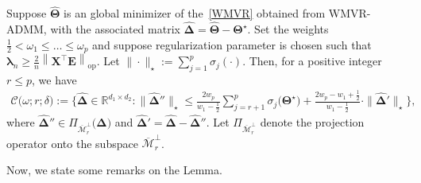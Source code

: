 \documentclass[alpha-refs]{wiley-article}
\begin{document}
\begin{lemma} \label{Cone_like_set}
Suppose $\widehat{\boldsymbol{\Theta}}$ is an global minimizer of the~\eqref{WMVR} obtained from WMVR-ADMM, with the associated matrix $\boldsymbol{\widehat{\Delta}} = \widehat{\boldsymbol{\Theta}}-\boldsymbol{\Theta^{\star}}$.
Set the weights $\frac{1}{2} < \omega_{1} \leq \dots \leq \omega_{p}$ and
suppose regularization parameter is chosen such that $\boldsymbol{\lambda}_{n}\geq\frac{2}{n}\left\| \boldsymbol{X}^{\top}\boldsymbol{E} \right\|_{\text{op}}$.
Let $\|\cdot\|_{\star}:=\sum_{j=1}^{p}\sigma_{j}(\cdot)$.
Then, for a positive integer $r\leq p$, we have
\begin{align} \label{cone_set}
    \mathcal{C}\big( \omega;r;\delta \big)
    := \bigg\{ \boldsymbol{\widehat{\Delta}}\in\mathbb{R}^{d_{1}\times d_{2}} :
    \|\boldsymbol{\widehat{\Delta}}''\|_{\star} \leq \frac{2w_{p}}{w_{1}-\frac{1}{2}} \sum_{j=r+1}^{p}\sigma_{j}\big(\boldsymbol{\Theta^{\star}}\big)
    + \frac{2w_{p}-w_{1}+\frac{1}{2}}{w_{1}-\frac{1}{2}}\cdot \| \boldsymbol{\widehat{\Delta}}' \|_{\star} \bigg\},
\end{align}
where $\boldsymbol{\widehat{\Delta}}'' \in \Pi_{\overline{\mathcal{M}}_{r}^{\perp}}\big(\boldsymbol{\widehat{\Delta}}\big)$ and $\boldsymbol{\widehat{\Delta}}'=\boldsymbol{\widehat{\Delta}}-\boldsymbol{\widehat{\Delta}}''$.
Let $\Pi_{\overline{\mathcal{M}}_{r}^{\perp}}$ denote the projection operator onto the subspace $\overline{\mathcal{M}}_{r}^{\perp}$.
\end{lemma}
Now, we state some remarks on the Lemma.
\end{document}
